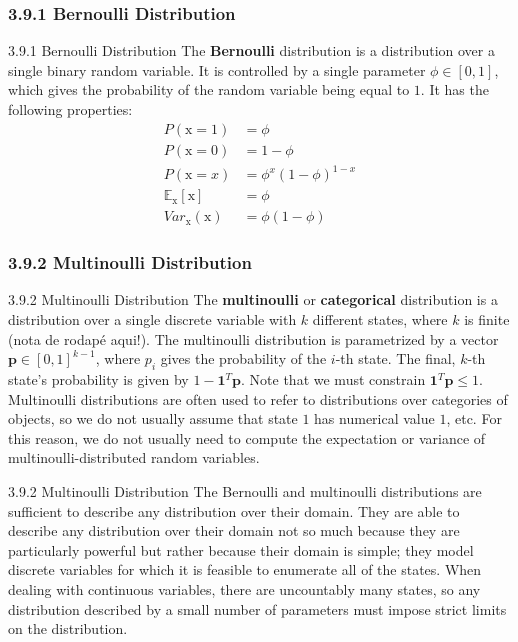 \subsubsection{3.9.1 Bernoulli Distribution}
\begin{frame}{3.9.1 Bernoulli Distribution}
    \justifying
    The \textbf{Bernoulli} distribution is a distribution over a single binary random variable. It is controlled by a single parameter $\phi \in  [0, 1]$, which gives the probability of the random variable being equal to $1$. It has the following properties:
    \begin{align}
        P(\mathrm{x} = 1) &= \phi \label{eq:3_16}\\
        P(\mathrm{x} = 0) &= 1 - \phi \label{eq:3_17}\\
        P(\mathrm{x} = x) &= \phi^{x}(1 - \phi)^{1 - x} \label{eq:3_18}\\
        \mathbb{E}_{\mathrm{x}}[\mathrm{x}] &= \phi \label{eq:3_19}\\
        Var_{\mathrm{x}}(\mathrm{x}) &= \phi(1 - \phi) \label{eq:3_20}
    \end{align}
\end{frame}

\subsubsection{3.9.2 Multinoulli Distribution}
\begin{frame}{3.9.2 Multinoulli Distribution}
    \justifying
    The \textbf{multinoulli} or \textbf{categorical} distribution is a distribution over a single discrete variable with $k$ different states, where $k$ is finite (nota de rodap\'{e} aqui!). The multinoulli distribution is parametrized by a vector $\boldsymbol{p} \in [0, 1]^{k−1}$, where $p_{i}$ gives the probability of the $i$-th state. The final, $k$-th state’s probability is given by $1 − \boldsymbol{1}^{T}\boldsymbol{p}$. Note that we must constrain $\boldsymbol{1}^{T} \boldsymbol{p} \leq 1$. Multinoulli distributions are often used to refer to distributions over categories of objects, so we do not usually assume that state $1$ has numerical value $1$, etc. For this reason, we do not usually need to compute the expectation or variance of multinoulli-distributed random variables.
\end{frame}

\begin{frame}{3.9.2 Multinoulli Distribution}
    \justifying
    The Bernoulli and multinoulli distributions are sufficient to describe any distribution over their domain. They are able to describe any distribution over their domain not so much because they are particularly powerful but rather because their domain is simple; they model discrete variables for which it is feasible to enumerate all of the states. When dealing with continuous variables, there are uncountably many states, so any distribution described by a small number of parameters must impose strict limits on the distribution.
\end{frame}

